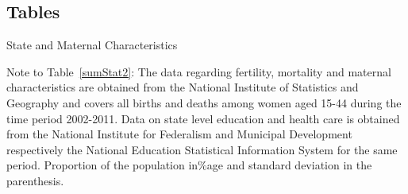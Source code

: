 \documentclass[a4paper, 11pt]{article}
\begin{document}
\begin{spacing}{2}




\section*{Tables}
\begin{table}[H]\caption{State and Maternal Characteristics}\label{sumStat2}
\begin{threeparttable}
{\small }
\begin{tablenotes}
{\scriptsize \item Note to Table~\ref{sumStat2}:	The data regarding fertility, mortality and maternal characteristics are obtained from the National Institute of Statistics and Geography and covers all births and deaths among women aged 15-44 during the time period 2002-2011. Data on state level education and health care is obtained from the National Institute for Federalism and Municipal Development respectively the National Education Statistical Information System for the same period. Proportion of the population in\%age and standard deviation in the parenthesis.}
\end{tablenotes}
\end{threeparttable}
\end{table}




\end{spacing}
\end{document}
